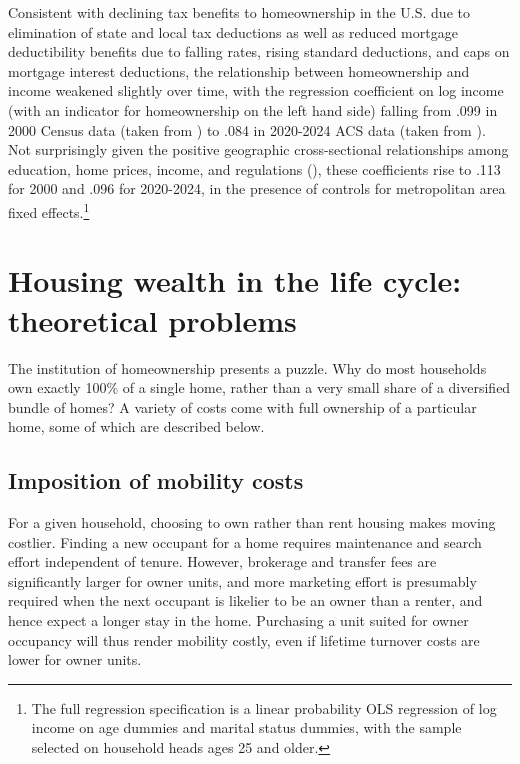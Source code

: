 \documentclass[12pt]{article}
\begin{document}
Consistent with declining tax benefits to homeownership in the U.S. due to
elimination of state and local tax deductions as well as reduced mortgage
deductibility benefits due to falling rates, rising standard deductions, and
caps on mortgage interest deductions, the relationship between homeownership
and income weakened slightly over time, with the regression coefficient on log
income (with an indicator for homeownership on the left hand side) falling from
.099 in 2000 Census data (taken from \textcite{IPUMS}) to .084 in 2020-2024 ACS
data (taken from \textcite{IPUMS}). Not surprisingly given the positive
geographic cross-sectional relationships among education, home prices, income,
and regulations (\textcite{davidoffCFR}), these coefficients rise to .113 for 2000 and
.096 for 2020-2024, in the presence of controls for metropolitan area fixed
effects.\footnote{The full regression specification is a linear probability OLS
regression of log income on age dummies and marital status dummies, with the
sample selected on household heads ages 25 and older.}


\section{Housing wealth in the life cycle: theoretical problems}

The institution of homeownership presents a puzzle.  Why do most households own
exactly 100\% of a single home, rather than a very small share of a diversified
bundle of homes? A variety of costs come with full ownership of a particular
home, some of which are described below.  

\subsection{Imposition of mobility costs}

For a given household, choosing to own rather than rent housing makes moving
costlier. Finding a new occupant for a home requires maintenance and search
effort independent of tenure. However, brokerage and transfer fees are
significantly larger for owner units, and more marketing effort is presumably
required when the next occupant is likelier to be an owner than a renter, and
hence expect a longer stay in the home. Purchasing a unit suited for owner
occupancy will thus render mobility costly, even if lifetime turnover costs are
lower for owner units.
\end{document}
